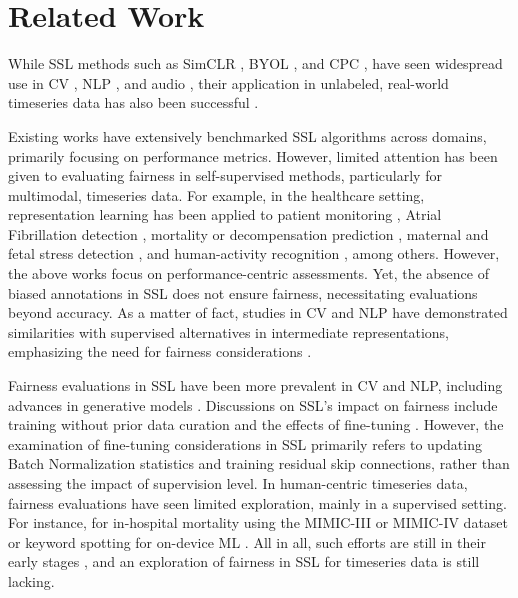 \documentclass[letterpaper]{article} %
\newcommand{\rev}[1]{\textcolor[rgb]{0.00,0.00,0.00}{#1}}
\begin{document}
\section{Related Work}
While SSL methods such as SimCLR \cite{chen2020simple}, BYOL \cite{grill2020bootstrap}, and CPC \cite{oord2018representation}, have seen widespread use in CV \cite{kolesnikov2019revisiting}, NLP \cite{lan2019albert}, and audio \cite{saeed2021contrastive},
their application in unlabeled, real-world timeseries data has also been successful \cite{haresamudram2022assessing,spathis2021self}.

Existing works have extensively benchmarked SSL algorithms across domains, primarily focusing on performance metrics. However, limited attention has been given to evaluating fairness in self-supervised methods, particularly for multimodal, timeseries data. For example, in the healthcare setting, representation learning has been applied to patient monitoring \cite{yeche2021neighborhood}, Atrial Fibrillation detection \cite{tonekaboni2021unsupervised}, mortality or decompensation prediction \cite{harutyunyan2019multitask}, maternal and fetal stress detection \cite{sarkar2021detection}, and human-activity recognition \cite{tang2020exploring}, among others. However, the above works focus on performance-centric assessments.
Yet, the absence of biased annotations in SSL does not ensure fairness, necessitating evaluations beyond accuracy. As a matter of fact, studies in CV and NLP have demonstrated similarities with supervised alternatives in intermediate representations, emphasizing the need for fairness considerations \cite{grigg2021self,chung2019unsupervised}.


Fairness evaluations in SSL have been more prevalent in CV \cite{ramapuram2021evaluating} and NLP, including advances in generative models \cite{sheng2019woman}. Discussions on SSL's impact on fairness include training without prior data curation and the effects of fine-tuning \cite{goyal2022vision,ramapuram2021evaluating}. \rev{However, the examination of fine-tuning considerations in SSL primarily refers to updating Batch Normalization statistics and training residual skip connections, rather than assessing the impact of supervision level.}
In human-centric timeseries data, fairness evaluations have seen limited exploration, mainly in a supervised setting. For instance, for in-hospital mortality using the MIMIC-III or MIMIC-IV dataset \cite{meng2022interpretability,roosli2022peeking} or keyword spotting for on-device ML \cite{10.1145/3591867}.
All in all, such efforts are still in their early stages \cite{yfantidou2023beyond}, and an exploration of fairness in SSL for timeseries data is still lacking.
\end{document}

